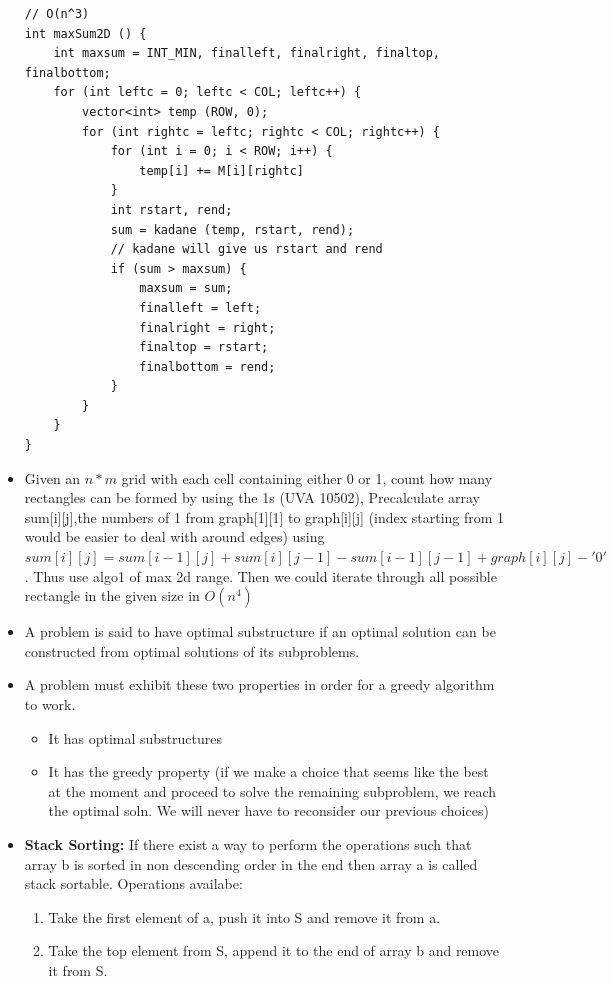 \documentclass[8pt, a4paper, oneside, twocolumn]{extarticle}
\begin{document}
\begin{itemize}
    \begin{verbatim}
// O(n^3)
int maxSum2D () {
    int maxsum = INT_MIN, finalleft, finalright, finaltop, finalbottom;
    for (int leftc = 0; leftc < COL; leftc++) {
        vector<int> temp (ROW, 0);
        for (int rightc = leftc; rightc < COL; rightc++) {
            for (int i = 0; i < ROW; i++) {
                temp[i] += M[i][rightc]
            }
            int rstart, rend;
            sum = kadane (temp, rstart, rend);
            // kadane will give us rstart and rend
            if (sum > maxsum) {
                maxsum = sum;
                finalleft = left;
                finalright = right;
                finaltop = rstart;
                finalbottom = rend;
            } 
        }
    }
}
    \end{verbatim}
    \item Given an $n*m$ grid with each cell containing either 0 or 1, count how many rectangles can be formed by using the 1s (UVA 10502), Precalculate array sum[i][j],the numbers of 1 from graph[1][1] to graph[i][j] (index starting from 1 would be easier to deal with around edges) using $sum[i][j] = sum[i-1][j]+sum[i][j-1]-sum[i-1][j-1] + graph[i][j]-'0'$. Thus use algo1 of max 2d range.
    Then we could iterate through all possible rectangle in the given size in $O(n^4)$
    \item A problem is said to have optimal substructure if an optimal solution can be constructed from optimal solutions of its subproblems.
    \item A problem must exhibit these two properties in order for a greedy algorithm to work.
    \begin{itemize}
        \item It has optimal substructures
        \item It has the greedy property (if we make a choice that seems like the best at the moment and proceed to solve the remaining subproblem, we reach the optimal soln. We will never have to reconsider our previous choices)
    \end{itemize}
    \item \textbf{Stack Sorting: }If there exist a way to perform the operations such that array b is sorted in non descending order in the end then array a is called stack sortable. Operations availabe:
    \begin{enumerate}
        \item Take the first element of a, push it into S and remove it from a.
        \item Take the top element from S, append it to the end of array b and remove it from S.

\end{enumerate}
\end{itemize}
\end{document}
